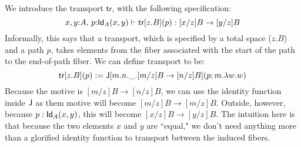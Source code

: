 \documentclass[12pt]{article}
\begin{document}
We introduce the transport $\textsf{tr}$, with the following specification:
\[x,y{:}A,\, p{:}\mathsf{Id}_{A}(x,y)\vdash \textsf{tr}[z.B](p):[x/z]B\to[y/z]B\]
Informally, this says that a transport, which is specified by a total space ($z.B$) and a path $p$, takes elements from the fiber associated with the start of the path to the end-of-path fiber. We can define transport to be:
\[\textsf{tr}[z.B](p) := \mathsf{J}[m.n.\_.[m/z]B\to[n/z]B](p;m.\lambda w.w)\]
Because the motive is $[m/z]B\to[n/z]B$, we can use the identity function inside $\mathsf{J}$ as them motive will become $[m/z]B\to[m/z]B$. Outside, however, because $p:\mathsf{Id}_{A}(x,y)$, this will become $[x/z]B\to[y/z]B$. The intuition here is that because the two elements $x$ and $y$ are ``equal," we don't need anything more than a glorified identity function to transport between the induced fibers.
\end{document}
